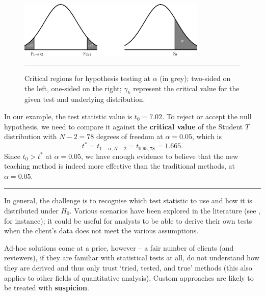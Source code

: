 \begin{figure}[t]
\centering
\includegraphics[width=0.8\textwidth]{Images/crit_reg.png}
\caption[\small Critical regions for hypothesis testing]{\small Critical regions for hypothesis testing at $\alpha$ (in grey); two-sided on the left, one-sided on the right; $\gamma_k$ represent the critical value for the given test and underlying distribution. }\label{fig:crit_reg}\hrule
\end{figure}
\newpage\noindent In our example, the test statistic value is $t_{0} = 7.02$. To reject or accept the null hypothesis, we need to compare it against the \textbf{critical value} of the Student $T$ distribution with $N-2=78$ degrees of freedom at $\alpha=0.05$, which is \begin{equation*}t^*= t_{1-\alpha, N-2}=t_{0.95, 78}=1.665.\end{equation*} Since $t_{0} > t^*$ at $\alpha=0.05$, we have enough evidence to believe that the new teaching method is indeed more effective than the traditional methods, at $\alpha=0.05$.
\begin{center}
    \rule{0.25\textwidth}{.4pt}
\end{center} In general, the challenge is to recognise which test statistic to use and how it is distributed under $H_0$. Various scenarios have been explored in the literature (see \cite{SA_KNNL}, for instance); it could be useful  for analysts to be able to derive their own tests when the client's data does not meet the various assumptions. \par Ad-hoc solutions come at a price, however -- a fair number of clients (and reviewers), if they are familiar with statistical tests at all, do not understand how they are derived and thus only trust `tried, tested, and true' methods (this also applies to other fields of quantitative analysis). Custom approaches are likely to be treated with \textbf{suspicion}.   

